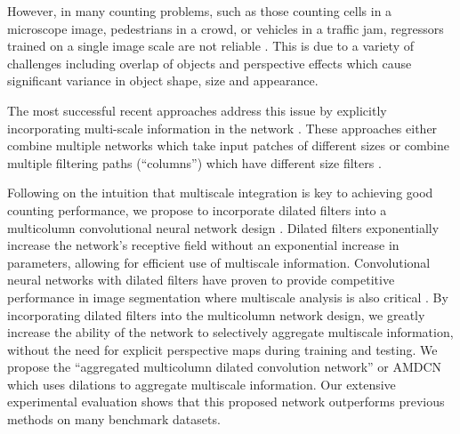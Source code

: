\documentclass[10pt,twocolumn,letterpaper]{article}
\begin{document}
However, in many counting problems, such as those counting cells
in a microscope image, pedestrians in a crowd, or vehicles in a traffic jam, regressors trained on a single image scale are not reliable \cite{rubio2016}. This is due to a variety of challenges including overlap of objects and perspective effects which cause significant variance in object shape, size and appearance.

The most successful recent approaches address this issue by explicitly incorporating multi-scale information in the network \cite{rubio2016,zhang2016single}. These approaches either combine multiple networks which take input patches of different sizes \cite{rubio2016} or combine multiple filtering paths (``columns'') which have different size filters \cite{zhang2016single}.


Following on the intuition that multiscale integration is key to achieving good counting performance, we propose to incorporate dilated filters \cite{yu2015} into a multicolumn convolutional neural network design \cite{zhang2016single}. Dilated filters exponentially increase the network's receptive field without an exponential increase in parameters, allowing for efficient use of multiscale information. Convolutional neural networks with dilated filters have proven to provide competitive performance in image segmentation where multiscale analysis is also critical \cite{yu2015,yu2017dilated}. By incorporating dilated filters into the multicolumn network design, we greatly increase the ability of the network to selectively aggregate multiscale information, without the need for explicit perspective maps during training and testing. We propose the ``aggregated multicolumn dilated convolution network'' or AMDCN which uses dilations to aggregate multiscale information. Our extensive experimental evaluation shows that this proposed network outperforms previous methods on many benchmark datasets.
\end{document}
